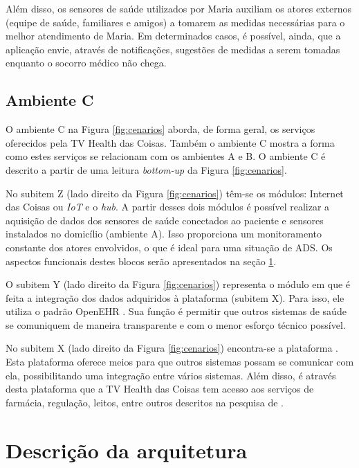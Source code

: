 Além disso, os sensores de saúde utilizados por Maria auxiliam os atores
externos (equipe de saúde, familiares e amigos) a tomarem as medidas
necessárias para o melhor atendimento de Maria.  Em determinados casos, é
possível, ainda, que a aplicação envie, através de notificações, sugestões de
medidas a serem tomadas enquanto o socorro médico não chega.

\subsection{Ambiente C} \label{subsec:ambiente-c}

O ambiente C na Figura \ref{fig:cenarios} aborda, de forma geral, os serviços
oferecidos pela TV Health das Coisas.  Também o ambiente C mostra a forma como
estes serviços se relacionam com os ambientes A e B. O ambiente C é descrito a
partir de uma leitura \textit{bottom-up} da Figura \ref{fig:cenarios}. 

No subitem Z (lado direito da Figura \ref{fig:cenarios}) têm-se os módulos:
Internet das Coisas ou \textit{IoT} e o \textit{hub}. A partir desses dois
módulos é possível realizar a aquisição de dados dos sensores de saúde
conectados ao paciente e sensores instalados no domicílio (ambiente A).  Isso
proporciona um monitoramento constante dos atores envolvidos, o que é ideal
para uma situação de ADS. Os aspectos funcionais destes blocos serão
apresentados na seção \ref{sec:descricao-solucao}.

O subitem Y (lado direito da Figura \ref{fig:cenarios}) representa o módulo em
que é feita a integração dos dados adquiridos à plataforma \nextsaude[]
(subitem X).  Para isso, ele utiliza o padrão OpenEHR \cite{mota2016}. Sua
função é permitir que outros sistemas de saúde se comuniquem de maneira
transparente e com o menor esforço técnico possível.

No subitem X (lado direito da Figura \ref{fig:cenarios}) encontra-se a
plataforma \nextsaude[]. Esta plataforma oferece meios para que outros sistemas
possam se comunicar com ela, possibilitando uma integração entre vários
sistemas. Além disso, é através desta plataforma que a TV Health das Coisas tem
acesso aos serviços de farmácia, regulação, leitos, entre outros descritos na
pesquisa de .

\section{Descrição da arquitetura}
\label{sec:descricao-solucao}


